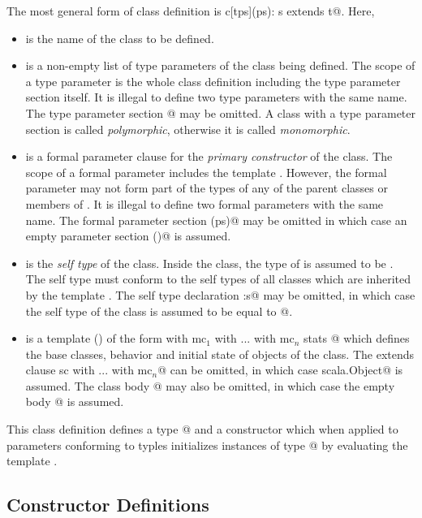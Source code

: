 \documentclass[11pt]{report}
\begin{document}
The most general form of class definition is 
\verb@class c[tps](ps): s extends t@.
Here,
\begin{itemize}
\item[]
\verb@c@ is the name of the class to be defined.
\item[] \verb@tps@ is a non-empty list of type parameters of the class
being defined.  The scope of a type parameter is the whole class
definition including the type parameter section itself.  It is
illegal to define two type parameters with the same name.  The type
parameter section \verb@[tps]@ may be omitted. A class with a type
parameter section is called {\em polymorphic}, otherwise it is called
{\em monomorphic}.
\item[] 
\verb@ps@ is a formal parameter clause for the {\em primary
constructor} of the class. The scope of a formal parameter includes
the template \verb@t@. However, the formal parameter may not form 
part of the types of any of the parent classes or members of \verb@t@.
It is illegal to define two formal parameters with the same name.
The formal parameter section \verb@(ps)@ may be omitted in which case
an empty parameter section \verb@()@ is assumed.
\item[] 
\verb@s@ is the {\em self type} of the class. Inside the
class, the type of \verb@this@ is assumed to be \verb@s@.  The self
type must conform to the self types of all classes which are inherited
by the template \verb@t@. The self type declaration \verb@:s@ may be
omitted, in which case the self type of the class is assumed to be
equal to \verb@c[tps]@.
\item[] 
\verb@t@ is a
template () of the form
\verb@sc with mc$_1$ with ... with mc$_n$ { stats }@
which defines the base classes, behavior and initial state of objects of
the class. The extends clause \verb@extends sc with ... with mc$_n$@
can be omitted, in which case
\verb@extends scala.Object@ is assumed.  The class body
@ may also be omitted, in which case the empty body
\verb@{}@ is assumed.
\end{itemize}
This class definition defines a type \verb@c[tps]@ and a constructor
which when applied to parameters conforming to typles \verb@ps@
initializes instances of type \verb@c[tps]@ by evaluating the template
\verb@t@.

\subsection{Constructor Definitions}
\end{document}
